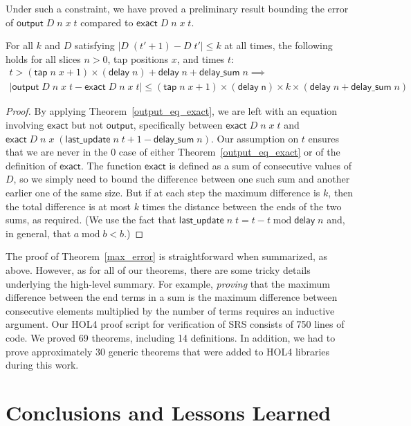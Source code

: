 \documentclass{llncs}
\begin{document}
Under such a constraint, we have proved a preliminary result bounding the error of $\mathsf{output}\;D\;n\;x\;t$ compared to $\mathsf{exact}\;D\;n\;x\;t$.
\begin{theorem}\label{max_error}
For all $k$ and $D$ satisfying $|D\;(t'+1)-D\;t'|\leq k$ at all times, the following holds for all slices $n>0$, tap positions $x$, and times $t$:
\begin{multline*}
t>(\mathsf{tap}\;n\;x+1)\times(\mathsf{delay}\;n)+\mathsf{delay}\;n+\mathsf{delay\_sum}\;n\implies\\
|\mathsf{output}\;D\;n\;x\;t-\mathsf{exact}\;D\;n\;x\;t|\leq(\mathsf{tap}\;n\;x+1)\times(\mathsf{delay\;n})\times k\times(\mathsf{delay}\;n+\mathsf{delay\_sum}\;n)
\end{multline*}
\end{theorem}
\begin{proof}
By applying Theorem~\ref{output_eq_exact}, we are left with an equation involving $\mathsf{exact}$ but not $\mathsf{output}$, specifically between $\mathsf{exact}\;D\;n\;x\;t$ and $\mathsf{exact}\;D\;n\;x\;(\mathsf{last\_update}\;n\;t+1-\mathsf{delay\_sum}\;n)$.
Our assumption on $t$ ensures that we are never in the $0$ case of either Theorem~\ref{output_eq_exact} or of the definition of $\mathsf{exact}$.
The function $\mathsf{exact}$ is defined as a sum of consecutive values of $D$, so we simply need to bound the difference between one such sum and another earlier one of the same size.
But if at each step the maximum difference is $k$, then the total difference is at most $k$ times the distance between the ends of the two sums, as required.
(We use the fact that $\mathsf{last\_update}\;n\;t=t-t\operatorname{mod}\mathsf{delay}\;n$ and, in general, that $a\operatorname{mod}b<b$.)
\end{proof}

The proof of Theorem~\ref{max_error} is straightforward when summarized, as above.
However, as for all of our theorems, there are some tricky details underlying the high-level summary.
For example, \emph{proving} that the maximum difference between the end terms in a sum is the maximum difference between consecutive elements multiplied by the number of terms requires an inductive argument.
Our HOL4 proof script for verification of SRS consists of 750 lines of code.
We proved 69 theorems, including 14 definitions.
In addition, we had to prove approximately 30 generic theorems that were added to HOL4 libraries during this work.

\section{Conclusions and Lessons Learned}
\label{sec-conclusions}
\end{document}
